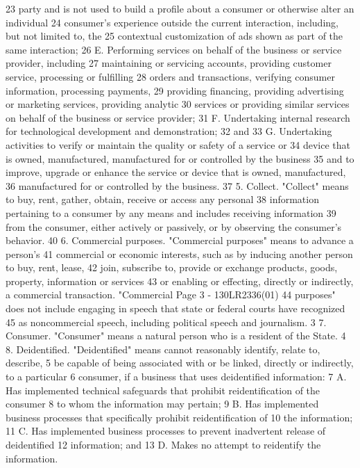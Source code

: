 23 party and is not used to build a profile about a consumer or otherwise alter an individual
24 consumer's experience outside the current interaction, including, but not limited to, the
25 contextual customization of ads shown as part of the same interaction;
26 E. Performing services on behalf of the business or service provider, including
27 maintaining or servicing accounts, providing customer service, processing or fulfilling
28 orders and transactions, verifying consumer information, processing payments,
29 providing financing, providing advertising or marketing services, providing analytic
30 services or providing similar services on behalf of the business or service provider;
31 F. Undertaking internal research for technological development and demonstration;
32 and
33 G. Undertaking activities to verify or maintain the quality or safety of a service or
34 device that is owned, manufactured, manufactured for or controlled by the business
35 and to improve, upgrade or enhance the service or device that is owned, manufactured,
36 manufactured for or controlled by the business.
37 5. Collect. "Collect" means to buy, rent, gather, obtain, receive or access any personal
38 information pertaining to a consumer by any means and includes receiving information
39 from the consumer, either actively or passively, or by observing the consumer's behavior.
40 6. Commercial purposes. "Commercial purposes" means to advance a person's
41 commercial or economic interests, such as by inducing another person to buy, rent, lease,
42 join, subscribe to, provide or exchange products, goods, property, information or services
43 or enabling or effecting, directly or indirectly, a commercial transaction. "Commercial 
Page 3 - 130LR2336(01)
44 purposes" does not include engaging in speech that state or federal courts have recognized
45 as noncommercial speech, including political speech and journalism.
3 7. Consumer. "Consumer" means a natural person who is a resident of the State.
4 8. Deidentified. "Deidentified" means cannot reasonably identify, relate to, describe,
5 be capable of being associated with or be linked, directly or indirectly, to a particular
6 consumer, if a business that uses deidentified information:
7 A. Has implemented technical safeguards that prohibit reidentification of the consumer
8 to whom the information may pertain;
9 B. Has implemented business processes that specifically prohibit reidentification of
10 the information;
11 C. Has implemented business processes to prevent inadvertent release of deidentified
12 information; and
13 D. Makes no attempt to reidentify the information.
